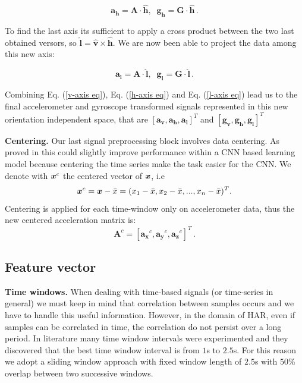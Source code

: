 \begin{equation}
	\label{h-axis eq}
	\boldsymbol{a_{h}} = \boldsymbol{A} \cdot \boldsymbol{\hat{h}} , \;\; \boldsymbol{g_{h}} = \boldsymbol{G} \cdot \boldsymbol{\hat{h}} \,.
\end{equation}

To find the last axis its sufficient to apply a cross product between the two last obtained versors, so $ \boldsymbol{\hat{l}} = \boldsymbol{\hat{v}} \times \boldsymbol{\hat{h}} $. We are now been able to project the data among this new axis:

\begin{equation}
	\label{l-axis eq}
	\boldsymbol{a_{l}} = \boldsymbol{A} \cdot \boldsymbol{\hat{l}} , \;\; \boldsymbol{g_{l}} = \boldsymbol{G} \cdot \boldsymbol{\hat{l}} \,.
\end{equation}

Combining Eq. (\ref{v-axis eq}), Eq. (\ref{h-axis eq}) and Eq. (\ref{l-axis eq}) lead us to the final accelerometer and gyroscope transformed signals represented in this new orientation independent space, that are $[\boldsymbol{a_{v}}, \boldsymbol{a_{h}}, \boldsymbol{a_{l}}]^T $ and $ [\boldsymbol{g_{v}}, \boldsymbol{g_{h}}, \boldsymbol{g_{l}}]^T $

\vspace{1em}
\textbf{Centering.}
Our last signal preprocessing block involves data centering. As proved in \cite{ignatov2018real} this could slightly
improve performance within a CNN based learning model because
centering the time series make the task easier for the CNN. We denote with $\boldsymbol{x}^{c}$ the centered vector of $\boldsymbol{x}$, i.e
\begin{equation}
  \label{eq:centering-func}
  \x^{c} = \x - \bar{x} = (x_1-\bar{x}, x_2-\bar{x},..., x_n-\bar{x})^T.
\end{equation}
Centering is applied for each time-window only on accelerometer data, thus the new centered acceleration matrix is:
\begin{equation}
  \label{eq:centering-accelerometer-data}
  \boldsymbol{A}^{c} = [\boldsymbol{a_{x}}^{c}, \boldsymbol{a_{y}}^{c}, \boldsymbol{a_{z}}^{c}]^T \,.
\end{equation}


\subsection{Feature vector}
\label{subsec:feature-vector}

\textbf{Time windows.} When dealing with time-based signals (or
time-series in general) we must keep in mind that correlation between
samples occurs and we have to handle this useful information. However,
in the domain of HAR, even if samples can be correlated in time, the
correlation do not persist over a long period. In literature many time
window intervals were experimented \cite{ignatov2018real} and they
discovered that the best time window interval is from $1$s to
$2.5$s. For this reason we adopt a sliding window approach with fixed
window length of $2.5$s with $50$\% overlap between two successive
windows.

